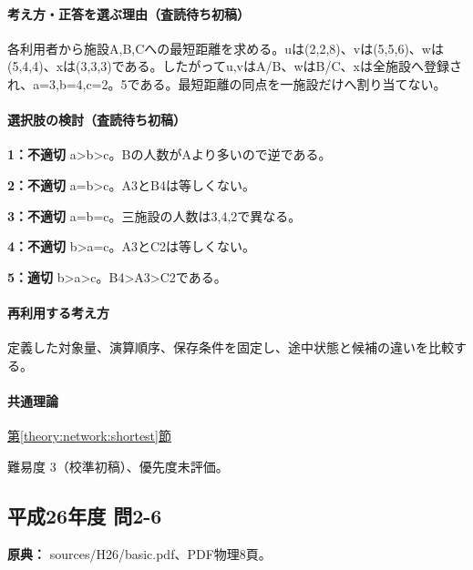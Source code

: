 \paragraph{考え方・正答を選ぶ理由（査読待ち初稿）} 各利用者から施設A,B,Cへの最短距離を求める。uは(2,2,8)、vは(5,5,6)、wは(5,4,4)、xは(3,3,3)である。したがってu,vはA/B、wはB/C、xは全施設へ登録され、a=\allowbreak{}3,b=\allowbreak{}4,c=\allowbreak{}2。5である。最短距離の同点を一施設だけへ割り当てない。

\paragraph{選択肢の検討（査読待ち初稿）}\mbox{}\par

\noindent\textbf{1：不適切} a>b>c。Bの人数がAより多いので逆である。\par

\noindent\textbf{2：不適切} a=\allowbreak{}b>c。A3とB4は等しくない。\par

\noindent\textbf{3：不適切} a=\allowbreak{}b=\allowbreak{}c。三施設の人数は3,4,2で異なる。\par

\noindent\textbf{4：不適切} b>a=\allowbreak{}c。A3とC2は等しくない。\par

\noindent\textbf{5：適切} b>a>c。B4>A3>C2である。\par

\paragraph{再利用する考え方} 定義した対象量、演算順序、保存条件を固定し、途中状態と候補の違いを比較する。

\paragraph{共通理論} \hyperref[theory:network:shortest]{第\ref*{theory:network:shortest}節}

\par 難易度 3（校準初稿）、優先度未評価。

\subsection{平成26年度 問2-6}
\label{q:h26-reg-basic-2-6}

\noindent\textbf{原典：} sources/H26/basic.pdf、PDF物理8頁。

